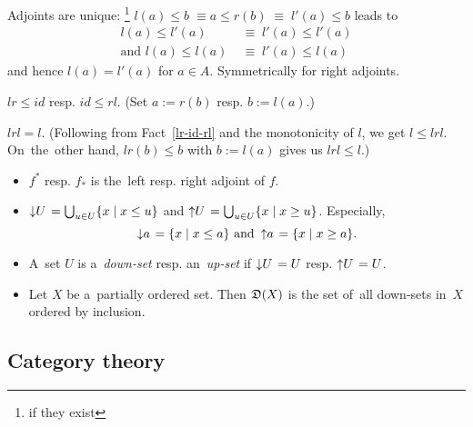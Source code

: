 \begin{rem}
  Adjoints are unique:\thinspace%
  \footnote{if they exist}
  $l(a) \le b \; \equiv a \le r(b) \; \equiv \; l'(a) \le b$ leads to
  \begin{align*}
    l(a) \le l'(a) \; &\equiv \; l'(a) \le l'(a) \\
    \text{and } l(a) \le l(a) \; &\equiv \; l'(a) \le l(a)
  \end{align*}
  and hence $l(a) = l'(a)$ for $a\in A$.
  Symmetrically for right adjoints.
\end{rem}

\begin{fact} \label{lr-id-rl}
  $lr \le id$ resp. $id \le rl$.
  (Set $a := r(b)$ resp. $b := l(a)$.)
\end{fact}

\begin{fact} \label{lrl=l}
  $lrl = l$.
  (Following from Fact~\ref{lr-id-rl} and the monotonicity of $l$, we get $l
   \le lrl$.
  On~the~other hand, $lr(b) \le b$ with $b := l(a)$ gives us $lrl \le l$.)
\end{fact}

\begin{itemize}
\item $f^*$ resp. $f_*$ is the~left resp. right adjoint of $f$.

\item $\left\downarrow U \right. = \bigcup_{u\in U} \{x \mid x \le u\}$ and
$\left\uparrow U \right. = \bigcup_{u\in U} \{x \mid x \ge u\}$.
Especially,
\[
  \left\downarrow a \right. = \{x \mid x \le a\} \text{ and } \left\uparrow a
  \right. = \{x \mid x \ge a\}.
\]

\item A~set $U$ is a~\emph{down-set\/} resp. an~\emph{up-set\/} if
$\left\downarrow U \right. = U$ resp. $\left\uparrow U \right. = U$.

\item Let $X$ be a~partially ordered set.
Then $\mathfrak{D}(X)$ is the set of~all down-sets in~$X$ ordered by inclusion.

\end{itemize}

\subsection*{Category theory}

